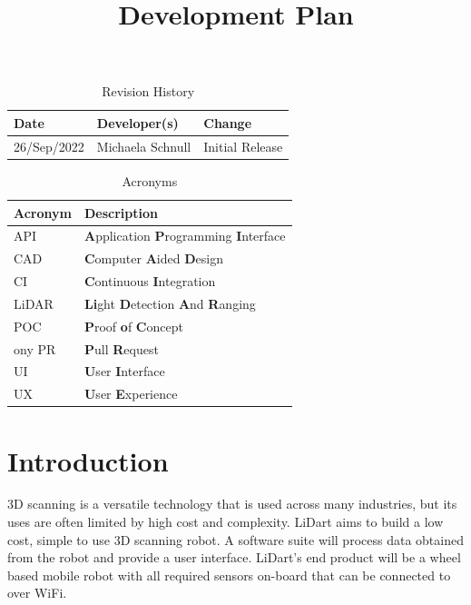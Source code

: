 \documentclass[titlepage]{article}
\title{Development Plan\\\progname}
\author{\authname}
\date{}
\begin{document}
\maketitle

\newpage

\begin{table}[hp]
\caption{Revision History} \label{TblRevisionHistory}
\begin{tabularx}{\textwidth}{llX}
\toprule
\textbf{Date} & \textbf{Developer(s)} & \textbf{Change}\\
\midrule
26/Sep/2022 & Michaela Schnull & Initial Release\\
\bottomrule
\end{tabularx}
\end{table}

\begin{table}[hp]
\caption{Acronyms} \label{Acronyms}
\begin{tabularx}{\textwidth}{lX}
\toprule
\textbf{Acronym} & \textbf{Description} \\
\midrule
API & \textbf{A}pplication \textbf{P}rogramming \textbf{I}nterface \\
CAD & \textbf{C}omputer \textbf{A}ided \textbf{D}esign\\
CI & \textbf{C}ontinuous \textbf{I}ntegration\\
LiDAR & \textbf{Li}ght \textbf{D}etection \textbf{A}nd \textbf{R}anging\\
POC & \textbf{P}roof \textbf{o}f \textbf{C}oncept\\ony
PR & \textbf{P}ull \textbf{R}equest\\
UI & \textbf{U}ser \textbf{I}nterface\\
UX & \textbf{U}ser \textbf{E}xperience\\
\bottomrule
\end{tabularx}
\end{table}

\newpage

\section{Introduction}

3D scanning is a versatile technology that is used across many industries, but its uses are often limited by high cost and complexity. LiDart aims to build a low cost, simple to use 3D scanning robot. A software suite will process data obtained from the robot and provide a user interface. LiDart's end product will be a wheel based mobile robot with all required sensors on-board that can be connected to over WiFi.
\end{document}
